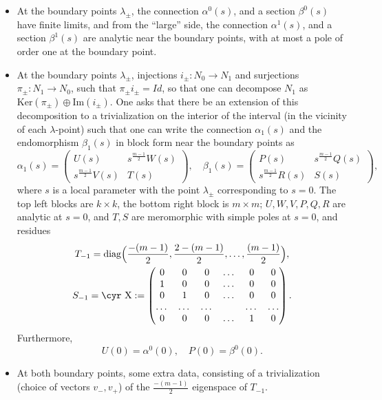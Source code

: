 \documentclass[12pt]{article}
\theoremstyle{definition}
\theoremstyle{remark}
\numberwithin{theorem}{section}
\newcommand{\Sh}{\hbox{\cyr X}}
\begin{document}
 \begin{itemize}
 \item At the boundary points $\lambda_\pm$, the connection $\alpha^0(s)$, and a section $\beta^0(s)$ have finite limits, and from the ``large'' side, the connection $\alpha^1(s)$, and a section $\beta^1(s)$ are analytic near the boundary points, with at most a  pole of order one at the boundary point.
 \item At the boundary points $\lambda_\pm$,   injections
$i_\pm\colon N_0\rightarrow N_1$ and   surjections
$\pi_\pm\colon N_1\rightarrow N_0$, such that
$\pi_\pm i_\pm = Id$, so that one can decompose $N_1$ as $
\mathrm{Ker}(\pi_\pm)\oplus \mathrm{Im}(i_\pm)$. One asks that there be an extension of
this decomposition to a trivialization on the interior of the
interval (in the vicinity of each $\lambda$-point) such that one can write the connection $\alpha_{1}(s)$
and the endomorphism $\beta_{1}(s)$ in block form near the boundary points as
\begin{equation*}
\alpha_{1}(s)=\begin{pmatrix}U(s)                & s ^{\frac{m-1} {2}}W(s)\\
                         s^{\frac{m-1} {2}}V(s)&T(s)                 \end{pmatrix},\quad
\beta_{1}(s)=\begin{pmatrix}P(s)                & s^{\frac{m-1} {2}}Q(s)\\
                        s^{\frac{m-1} {2}}R(s)&S(s) \end{pmatrix},
\end{equation*}
where $s$ is a local parameter with the point $\lambda_\pm$ corresponding to
$s=0$. The top left blocks are $k\times k$, the bottom right block is
$m\times m$; $U,W,V,P,Q,R$ are analytic at $s=0$, and $T,S$ are meromorphic
with simple poles at $s=0$, and residues 
\begin{gather}
T_{-1}= \mathrm{diag}\Bigl({\frac{-(m-1)}{2}},{\frac{2-(m-1)}{2}},\dots,{\frac{(m-1)}{2}}\Bigr),\\
S_{-1}=\Sh:= \begin{pmatrix}0&0&0&\dots&0&0\\ 1&0&0&\dots&0&0\\0&1&0&\dots&0&0\\
\dots&\dots&\dots&&\dots&\dots\\
0&0&0&\dots&1&0 \end{pmatrix}.
\end{gather}
Furthermore,
\begin{equation*}
U(0) = \alpha^{0}(0),\quad P(0) = \beta^{0}(0).
\end{equation*}

\item At both boundary points, some extra data, consisting of a
trivialization (choice of vectors $v_-, v_+$) of the $\frac{-(m-1)}{2}$
eigenspace of $T_{-1}$.
\end{itemize}
\end{document}
